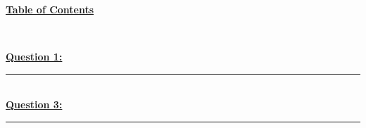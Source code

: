 \documentclass[12pt]{article}
\begin{document}
\begin{center}
	\hypertarget{toc}{\LARGE \underline{\textbf{Table of Contents}}}\\
\end{center}

\hyperlink{1}{\textbf{Question 1:}}
\vspace{1mm}
\hrule
\vspace{1mm} \leavevmode \\

\hyperlink{3}{\textbf{Question 3:}}
\vspace{1mm}
\hrule
\vspace{1mm} \leavevmode \\

\newpage
\end{document}
